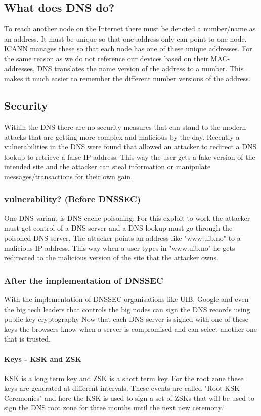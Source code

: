 \documentclass{article}
\begin{document}
		\subsection{What does DNS do?}
		To reach another node on the Internet there must be denoted a number/name as an address. It must be unique so that one address only can point to one node.\\
		ICANN manages these so that each node has one of these unique addresses. For the same reason as we do not reference our devices based on their MAC-addresses, DNS translates the name version of the address to a number. This makes it much easier to remember the different number versions of the address.
		
		\subsection{Security}
		Within the DNS there are no security measures that can stand to the modern attacks that are getting more complex and malicious by the day. Recently a vulnerabilities in the DNS were found that allowed an attacker to redirect a DNS lookup to retrieve a false IP-address. This way the user gets a fake version of the intended site and the attacker can steal information or manipulate messages/transactions for their own gain.
            \subsubsection{vulnerability? (Before DNSSEC)}
            One DNS variant is DNS cache poisoning. For this exploit to work the attacker must get control of a DNS server and a DNS lookup must go through the poisoned DNS server. The attacker points an address like "www.uib.no" to a malicious IP-address. This way when a user types in "www.uib.no" he gets redirected to the malicious version of the site that the attacker owns.
            \subsubsection{After the implementation of DNSSEC}
            With the implementation of DNSSEC organisations like UIB, Google and even the big tech leaders that controls the big nodes can sign the DNS records using public-key cryptography\cite{icann}
            Now that each DNS server is signed with one of these keys the browsers know when a server is compromised and can select another one that is trusted.
            \paragraph{Keys - KSK and ZSK}
            KSK is a long term key and ZSK is a short term key. For the root zone these keys are generated at different intervals. These events are called "Root KSK Ceremonies" and here the KSK is used to sign a set of ZSKs that will be used to sign the DNS root zone for three months until the next new ceremony.` \cite{iana}
            
\end{document}
